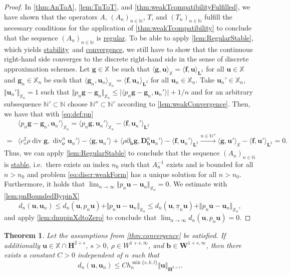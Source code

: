 \documentclass{m2an}
\newcommand{\inner}[1]{\langle #1 \rangle}
\newcommand{\innerr}[1]{\langle \rho#1 \rangle}
\newcommand{\innercsr}[1]{\langle c_s^2 \rho#1 \rangle}
\newcommand{\nv}{\boldsymbol{\nu}}
\newcommand{\bflow}{\mathbf{b}}
\renewcommand{\u}{\mathbf{u}}
\renewcommand{\div}{\operatorname{div}}
\newcommand{\X}{\mathbb{X}}
\newcommand{\Xn}{\mathbb{X}_n}
\newcommand{\bH}{{\mathbf H}}
\newcommand{\bD}{\mathbf{D}}
\newcommand{\bW}{\mathbf{W}}
\newcommand{\bL}{\mathbf{L}}
\newcommand{\bff}{\mathbf{f}}
\newcommand{\N}{\mathbb{N}}
\newcommand{\seq}[1]{(#1_n)_{n \in \mathbb{N}}}
\newcommand{\spl}{\langle}
\newcommand{\spr}{\rangle}
\newcommand{\diffb}{\partial_{\bflow}}
\newcommand{\ddiffb}{\bD_{\bflow}^n}
\newcommand{\ddiv}{\div_{\nv}^n}
\newcommand{\pinX}{\underline{\pi}_n}
\newcommand\convergence{\hyperlink{converge}{convergence}}
\newcommand\stable{\hyperlink{stable}{stable}}
\newcommand\stability{\hyperlink{stable}{stability}}
\newcommand\regular{\hyperlink{regular}{regular}}
\theoremstyle{plain}
\newtheorem{theorem}{Theorem}%
\theoremstyle{definition}
\begin{document}
\begin{proof}
   In \cref{thm:AnToA}, \cref{lem:TnToT}, and  \cref{thm:weakTcompatibilityFulfilled}, we have shown that the operators $A$, $\seq{A}$, $T$, and $\seq{T}$ fulfill the necessary conditions for the application of \cref{thm:weakTcompatibility} to conclude that the sequence $\seq{A}$ is \regular. To be able to apply \cref{lem:RegularStable}, which yields \stability~and \convergence, we still have to show that the continuous right-hand side converges to the discrete right-hand side in the sense of discrete approximation schemes. Let $\bm{g} \in \X$ be such that $\spl \bm{g}, \u \spr_{\X} = \spl \bff, \u \spr_{\bL^2}$ for all $\u \in \X$ and $\bm{g}_n \in \Xn$ be such that $\spl \bm{g}_n, \u_n \spr_{\Xn} = \spl \bff, \u_n \spr_{\bL^2}$ for all $\u_n \in \Xn$. Take $\u_n' \in \Xn$, $\Vert \u_n' \Vert_{\Xn} = 1$ such that $\Vert p_n \bm{g} - \bm{g}_n \Vert_{\Xn} \le \vert \spl p_n \bm{g} - \bm{g}_n, \u_n' \spr \vert + 1/n$ and for an arbitrary subsequence $\N' \subset \N$ choose $\N'' \subset \N'$ according to \cref{lem:weakConvergence}. Then, we have that with \eqref{eq:def:pn}
   \begin{align*}
      &\inner{p_n \bm{g} - \bm{g}_n, \u_n'}_{\Xn} = \inner{p_n \bm{g}, \u_n'}_{\Xn} - \inner{\bff, \u_n'}_{\bL^2} \\
      = &\innercsr{\div \bm{g}, \ddiv \u_n'} \! - \!\inner{\bm{g}, \u_n'} \!+ \!\innerr{ \diffb \bm{g}, \ddiffb \u_n'} \!- \!\inner{\bff, \u_n'}_{\bL^2} \!\! \overset{n \in \N''}{\to} \!\! \inner{\bm{g}, \u'}_{\X} \! - \!\inner{ \bff, \u'}_{\bL^2}\!\! = \! 0. 
   \end{align*}
   Thus, we can apply \cref{lem:RegularStable} to conclude that the sequence $\seq{A}$ is \stable, i.e.~there exists an index $n_0$ such that $A_n^{-1}$ exists and is bounded for all $n > n_0$ and problem \eqref{eq:discr:weakForm} has a unique solution for all $n > n_0$. Furthermore, it holds that $\lim_{n \to \infty} \Vert p_n \u - \u_n \Vert_{\Xn} = 0$. We estimate with \cref{lem:pnBoundedBypinX}
   \begin{equation}\label{eq:convergenceThm:estimate}
         d_n(\u,\u_n) \le d_n(\u,p_n \u) + \Vert p_n \u - \u_n \Vert_{\Xn} \le d_n(\u,\pinX \u) + \Vert p_n \u - \u_n \Vert_{\Xn},
   \end{equation}
   and apply \cref{lem:dnupinXdtoZero} to conclude that $\lim_{n \to \infty} d_n(\u,p_n \u) = 0$. 
\end{proof}

 
\begin{theorem}\label{thm:convEstimates}
   Let the assumptions from \cref{thm:convergence} be satisfied. If additionally $\u \in \X \cap \bH^{2+s}$, $s > 0$, $\rho \in W^{1+s,\infty}$, and $\bflow \in \bW^{1+s,\infty}$, then there exists a constant $C > 0$ independent of $n$ such that
   \begin{equation*}
      d_n(\u,\u_n) \le C h_n^{\min\{s,k,l\}}  \Vert \u \Vert_{\bH^{2+s}}.
   \end{equation*}
\end{theorem}
\end{document}
